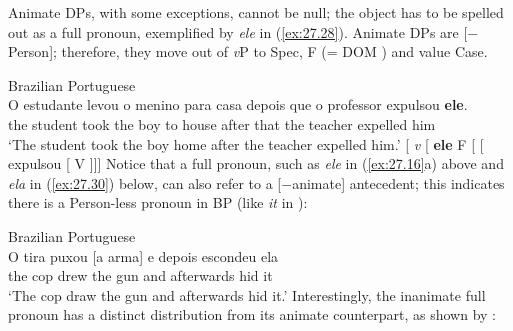 \documentclass[output=paper]{langsci/langscibook}
\begin{document}
Animate DPs, with some exceptions, cannot be null; the object has to be spelled
out as a full pronoun, exemplified by \emph{ele} in (\ref{ex:27.28}).
Animate DPs are [$-$Person]; therefore, they move out of \emph{v}P to Spec,
F\tss{[Person]} (= DOM ){} and value Case.

\ea\label{ex:27.28} Brazilian Portuguese\\
    \gll O   estudante levou   o     menino para  casa     depois  que o professor  expulsou \textbf{ele}.\\
         the student     took   the  boy       to       house   after     that the teacher    expelled him\\
    \glt `The student took the boy home after the teacher expelled him.'
\ex\label{ex:27.29}
    {}[ \emph{v} [ \textbf{ele\tss{[$-$Person]}}
    F\tss{[Person]}\tss{} [ [ expulsou [ V  ]]]
\z
Notice that a full pronoun, such as \emph{ele} in (\ref{ex:27.16}a) above
and \emph{ela} in (\ref{ex:27.30}) below, can also refer to a [$-$animate]
antecedent; this indicates there is a Person-less pronoun in \gls{BP} (like
\emph{it} in ):

\ea\label{ex:27.30} Brazilian Portuguese\\
    \gll O     tira   puxou [a arma] e depois escondeu \underline{\hphantom{ela}} ela\\
          the  cop  drew    the   gun      and afterwards hid {} it\\
    \glt `The cop draw the gun and afterwards hid it.'
\z
Interestingly, the inanimate full pronoun has a distinct distribution from its
animate counterpart, as shown by \citet{Galves2001}:
\end{document}
